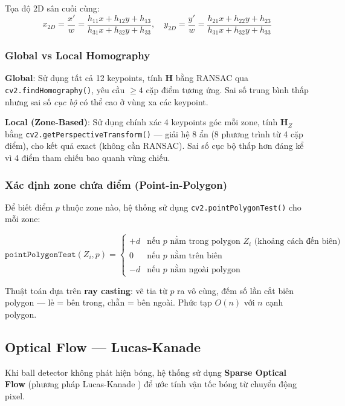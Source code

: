 \documentclass[12pt,a4paper]{article}
\begin{document}
Tọa độ 2D sân cuối cùng:
\begin{equation}
x_{2D} = \frac{x'}{w} = \frac{h_{11}x + h_{12}y + h_{13}}{h_{31}x + h_{32}y + h_{33}}, \quad
y_{2D} = \frac{y'}{w} = \frac{h_{21}x + h_{22}y + h_{23}}{h_{31}x + h_{32}y + h_{33}}
\end{equation}

\subsubsection{Global vs Local Homography}
\textbf{Global}: Sử dụng tất cả 12 keypoints, tính $\mathbf{H}$ bằng RANSAC qua \texttt{cv2.findHomography()}, yêu cầu $\geq 4$ cặp điểm tương ứng. Sai số trung bình thấp nhưng sai số \textit{cục bộ} có thể cao ở vùng xa các keypoint.

\textbf{Local (Zone-Based)}: Sử dụng chính xác 4 keypoints góc mỗi zone, tính $\mathbf{H}_Z$ bằng \texttt{cv2.getPerspectiveTransform()} --- giải hệ 8 ẩn (8 phương trình từ 4 cặp điểm), cho kết quả exact (không cần RANSAC). Sai số cục bộ thấp hơn đáng kể vì 4 điểm tham chiếu bao quanh vùng chiếu.

\subsubsection{Xác định zone chứa điểm (Point-in-Polygon)}
Để biết điểm $p$ thuộc zone nào, hệ thống sử dụng \texttt{cv2.pointPolygonTest()} cho mỗi zone:

\begin{equation}
\texttt{pointPolygonTest}(Z_i, p) = \begin{cases}
    +d & \text{nếu } p \text{ nằm trong polygon } Z_i \text{ (khoảng cách đến biên)} \\
    0 & \text{nếu } p \text{ nằm trên biên} \\
    -d & \text{nếu } p \text{ nằm ngoài polygon}
\end{cases}
\end{equation}

Thuật toán dựa trên \textbf{ray casting}: vẽ tia từ $p$ ra vô cùng, đếm số lần cắt biên polygon --- lẻ = bên trong, chẵn = bên ngoài. Phức tạp $O(n)$ với $n$ cạnh polygon.

\subsection{Optical Flow --- Lucas-Kanade}
\label{sec:optical_flow}

Khi ball detector không phát hiện bóng, hệ thống sử dụng \textbf{Sparse Optical Flow} (phương pháp Lucas-Kanade \cite{lucas1981}) để ước tính vận tốc bóng từ chuyển động pixel.
\end{document}
